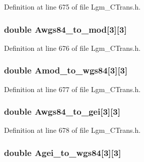 Definition at line 675 of file Lgm\_\-CTrans.h.\hypertarget{struct_lgm___c_trans_3bde4bf5f61bc97b0c2984ea06677989}{
\subsubsection[{Awgs84\_\-to\_\-mod}]{\setlength{\rightskip}{0pt plus 5cm}double {\bf Awgs84\_\-to\_\-mod}\mbox{[}3\mbox{]}\mbox{[}3\mbox{]}}}
\label{struct_lgm___c_trans_3bde4bf5f61bc97b0c2984ea06677989}




Definition at line 676 of file Lgm\_\-CTrans.h.\hypertarget{struct_lgm___c_trans_7fb70629ed011b03df0429787e1b9ad4}{
\subsubsection[{Amod\_\-to\_\-wgs84}]{\setlength{\rightskip}{0pt plus 5cm}double {\bf Amod\_\-to\_\-wgs84}\mbox{[}3\mbox{]}\mbox{[}3\mbox{]}}}
\label{struct_lgm___c_trans_7fb70629ed011b03df0429787e1b9ad4}




Definition at line 677 of file Lgm\_\-CTrans.h.\hypertarget{struct_lgm___c_trans_13ae99230c1a3caec0d3b78ad714de4b}{
\subsubsection[{Awgs84\_\-to\_\-gei}]{\setlength{\rightskip}{0pt plus 5cm}double {\bf Awgs84\_\-to\_\-gei}\mbox{[}3\mbox{]}\mbox{[}3\mbox{]}}}
\label{struct_lgm___c_trans_13ae99230c1a3caec0d3b78ad714de4b}




Definition at line 678 of file Lgm\_\-CTrans.h.\hypertarget{struct_lgm___c_trans_e70d75fd4a8b4ef9a3271f875183b402}{
\subsubsection[{Agei\_\-to\_\-wgs84}]{\setlength{\rightskip}{0pt plus 5cm}double {\bf Agei\_\-to\_\-wgs84}\mbox{[}3\mbox{]}\mbox{[}3\mbox{]}}}
\label{struct_lgm___c_trans_e70d75fd4a8b4ef9a3271f875183b402}




